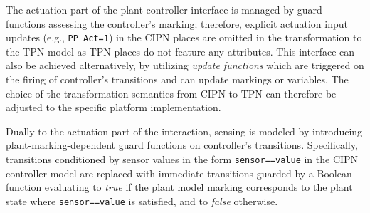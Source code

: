The actuation part of the plant-controller interface is managed by guard functions assessing the controller's marking; therefore, explicit actuation input updates (e.g., \verb!PP_Act=1!) in the CIPN places are omitted in the transformation to the TPN model as TPN places do not feature any attributes. This interface can also be achieved alternatively, by utilizing \emph{update functions} which are triggered on the firing of controller's transitions and can update markings or variables. The choice of the transformation semantics from CIPN to TPN can therefore be adjusted to the specific platform implementation.





Dually to the actuation part of the interaction, %
sensing is modeled by introducing plant-marking-dependent guard functions on controller's transitions. Specifically, transitions conditioned by sensor values in the form \verb!sensor==value! in the CIPN controller model are replaced with immediate transitions guarded by a Boolean function evaluating to \emph{true} if the plant model marking corresponds to the plant state where \verb!sensor==value! is satisfied, and to \emph{false} otherwise.

